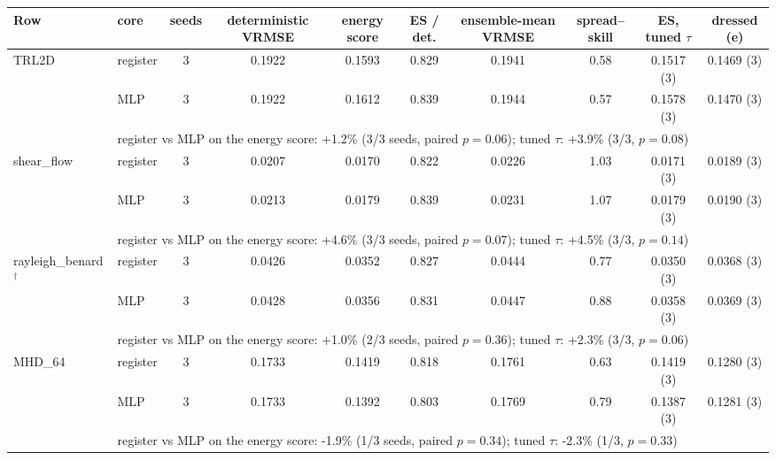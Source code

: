 \begin{tabular}{llcccccccc}
\toprule
Row & core & seeds & deterministic VRMSE & energy score & ES / det. & ensemble-mean VRMSE & spread--skill & ES, tuned $\tau$ & dressed (e) \\
\midrule
TRL2D & register & 3 & 0.1922 & 0.1593 & 0.829 & 0.1941 & 0.58 & 0.1517 (3) & 0.1469 (3) \\
 & MLP & 3 & 0.1922 & 0.1612 & 0.839 & 0.1944 & 0.57 & 0.1578 (3) & 0.1470 (3) \\
& \multicolumn{9}{l}{\footnotesize register vs MLP on the energy score: +1.2\% (3/3 seeds, paired $p=0.06$); tuned $\tau$: +3.9\% (3/3, $p=0.08$)} \\
shear\_flow & register & 3 & 0.0207 & 0.0170 & 0.822 & 0.0226 & 1.03 & 0.0171 (3) & 0.0189 (3) \\
 & MLP & 3 & 0.0213 & 0.0179 & 0.839 & 0.0231 & 1.07 & 0.0179 (3) & 0.0190 (3) \\
& \multicolumn{9}{l}{\footnotesize register vs MLP on the energy score: +4.6\% (3/3 seeds, paired $p=0.07$); tuned $\tau$: +4.5\% (3/3, $p=0.14$)} \\
rayleigh\_benard$^\dagger$ & register & 3 & 0.0426 & 0.0352 & 0.827 & 0.0444 & 0.77 & 0.0350 (3) & 0.0368 (3) \\
 & MLP & 3 & 0.0428 & 0.0356 & 0.831 & 0.0447 & 0.88 & 0.0358 (3) & 0.0369 (3) \\
& \multicolumn{9}{l}{\footnotesize register vs MLP on the energy score: +1.0\% (2/3 seeds, paired $p=0.36$); tuned $\tau$: +2.3\% (3/3, $p=0.06$)} \\
MHD\_64 & register & 3 & 0.1733 & 0.1419 & 0.818 & 0.1761 & 0.63 & 0.1419 (3) & 0.1280 (3) \\
 & MLP & 3 & 0.1733 & 0.1392 & 0.803 & 0.1769 & 0.79 & 0.1387 (3) & 0.1281 (3) \\
& \multicolumn{9}{l}{\footnotesize register vs MLP on the energy score: -1.9\% (1/3 seeds, paired $p=0.34$); tuned $\tau$: -2.3\% (1/3, $p=0.33$)} \\
\bottomrule
\end{tabular}
